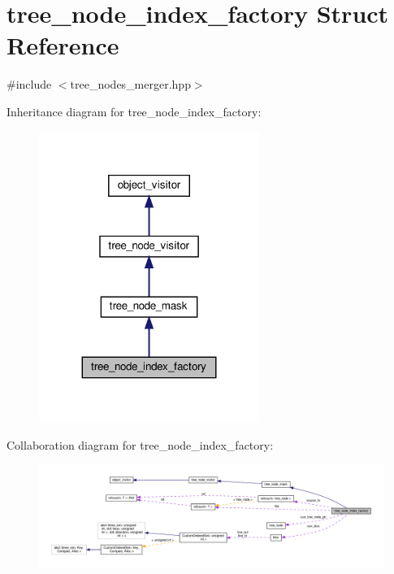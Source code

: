 \hypertarget{structtree__node__index__factory}{}\section{tree\+\_\+node\+\_\+index\+\_\+factory Struct Reference}
\label{structtree__node__index__factory}


{\ttfamily \#include $<$tree\+\_\+nodes\+\_\+merger.\+hpp$>$}



Inheritance diagram for tree\+\_\+node\+\_\+index\+\_\+factory\+:
\nopagebreak
\begin{figure}[H]
\begin{center}
\leavevmode
\includegraphics[width=203pt]{d0/d29/structtree__node__index__factory__inherit__graph}
\end{center}
\end{figure}


Collaboration diagram for tree\+\_\+node\+\_\+index\+\_\+factory\+:
\nopagebreak
\begin{figure}[H]
\begin{center}
\leavevmode
\includegraphics[width=350pt]{da/d22/structtree__node__index__factory__coll__graph}
\end{center}
\end{figure}
